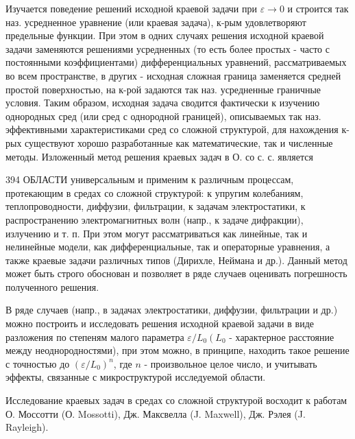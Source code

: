 \documentclass[10pt]{article}
\begin{document}
Изучается поведение решений исходной краевой задачи при $\varepsilon \rightarrow 0$ и строится так наз. усредненное уравнение (или краевая задача), к-рым удовлетворяют предельные функции. При этом в одних случаях решения исходной краевой задачи заменяются решениями усредненных (то есть более простых - часто с постоянными коэффициентами) дифференциальных уравнений, рассматриваемых во всем пространстве, в других - исходная сложная граница заменяется средней простой поверхностью, на к-рой задаются так наз. усредненные граничные условия. Таким образом, исходная задача сводится фактически к изучению однородных сред (или сред с однородной границей), описываемых так наз. эффективными характеристиками сред со сложной структурой, для нахождения к-рых существуют хорошо разработанные как математические, так и численные методы. Изложенный метод решения краевых задач в О. со с. с. является



394 ОБЛАСТИ универсальным и применим к различным процессам, протекающим в средах со сложной структурой: к упругим колебаниям, теплопроводности, диффузии, фильтрации, к задачам электростатики, к распространению электромагнитных волн (напр., к задаче дифракции), излучению и т. п. При этом могут рассматриваться как линейные, так и нелинейные модели, как дифференциальные, так и операторные уравнения, а также краевые задачи различных типов (Дирихле, Неймана и др.). Данный метод может быть строго обоснован и позволяет в ряде случаев оценивать погрешность полученного решения.



В ряде случаев (напр., в задачах электростатики, диффузии, фильтрации и др.) можно построить и исследовать решения исходной краевой задачи в виде разложения по степеням малого параметра $\varepsilon / L_{0}\left(L_{0}\right.$ - характерное расстояние между неоднородностями), при этом можно, в принципе, находить такое решение с точностью до $\left(\varepsilon / L_{0}\right)^{n}$, где $n$ - произвольное целое число, и учитывать эффекты, связанные с микроструктурой исследуемой области.



Исследование краевых задач в средах со сложной структурой восходит к работам О. Моссотти (О. Mossotti), Дж. Максвелла (J. Maxwell), Дж. Рэлея (J. Rayleigh).
\end{document}
